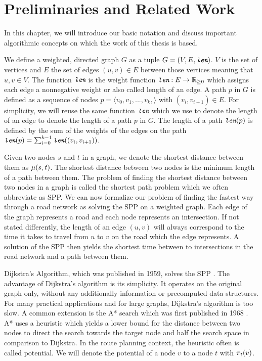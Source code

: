 
\chapter{Preliminaries and Related Work}
\label{ch:preliminaries}
In this chapter, we will introduce our basic notation and discuss important algorithmic concepts on which the work of this thesis is based.

We define a weighted, directed graph $G$ as a tuple $G=(V,E,\texttt{\itshape len})$. $V$ is the set of vertices and $E$ the set of edges $(u,v) \in E$ between those vertices meaning that $u,v \in V$. The function $\texttt{\itshape len}$ is the weight function $\texttt{\itshape len}: E \rightarrow \mathbb{R}_{\ge 0}$ which assigns each edge a nonnegative weight or also called length of an edge. A path $p$ in $G$ is defined as a sequence of nodes $p = \langle v_0,v_1,...,v_k, \rangle$ with $(v_i,v_{i+1}) \in E$. For simplicity, we will reuse the same function $\texttt{\itshape len}$ which we use to denote the length of an edge to denote the length of a path $p$ in $G$. The length of a path $\texttt{\itshape len}(p)$ is defined by the sum of the weights of the edges on the path $\texttt{\itshape len}(p) = \sum_{i=0}^{k-1}{\texttt{\itshape len}((v_i,v_{i+1}))}$.

Given two nodes $s$ and $t$ in a graph, we denote the shortest distance between them as $\mu(s,t)$. The shortest distance between two nodes is the minimum length of a path between them. The problem of finding the shortest distance between two nodes in a graph is called the shortest path problem which we often abbreviate as SPP. We can now formalize our problem of finding the fastest way through a road network as solving the SPP on a weighted graph. Each edge of the graph represents a road and each node represents an intersection. If not stated differently, the length  of an edge $(u,v)$ will always correspond to the time it takes to travel from $u$ to $v$ on the road which the edge represents. A solution of the SPP then yields the shortest time between to intersections in the road network and a path between them.

Dijkstra's Algorithm, which was published in 1959, solves the SPP \cite{dijkstra:1959}. The advantage of Dijkstra's algorithm is its simplicity. It operates on the original graph only, without any additionally information or precomputed data structures. For many practical applications and for large graphs, Dijkstra's algorithm is too slow. A common extension is the A* search which was first published in 1968 \cite{hart:1968}. A* uses a heuristic which yields a lower bound for the distance between two nodes to direct the search towards the target node and half the search space in comparison to Dijkstra. In the route planning context, the heuristic often is called potential. We will denote the potential of a node $v$ to a node $t$ with $\pi_t(v)$.

